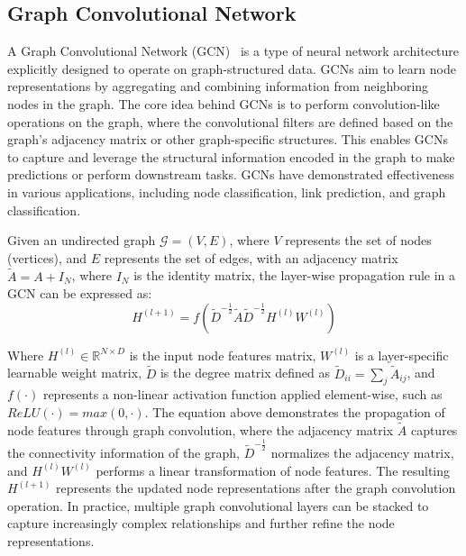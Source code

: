 \subsection{Graph Convolutional Network}
\label{subsec:graph_convolutional_network}%

A Graph Convolutional Network (GCN)~\cite{DBLP:journals/corr/KipfW16, daigavane2021understanding} is a type of neural network architecture explicitly designed to operate on graph-structured data.
GCNs aim to learn node representations by aggregating and combining information from neighboring nodes in the graph.
The core idea behind GCNs is to perform convolution-like operations on the graph, where the convolutional filters are defined based on the graph's adjacency matrix or other graph-specific structures.
This enables GCNs to capture and leverage the structural information encoded in the graph to make predictions or perform downstream tasks.
GCNs have demonstrated effectiveness in various applications, including node classification, link prediction, and graph classification.

Given an undirected graph $\mathcal{G} = (V, E)$, where $V$ represents the set of nodes (vertices), and $E$ represents the set of edges, with an adjacency matrix $\tilde{A}=A+I_N$, where $I_N$ is the identity matrix, the layer-wise propagation rule in a GCN can be expressed as:
\begin{equation}
    \label{eq:gcn_convolution}
    H^{(l+1)} = f \left( \tilde{D}^{-\tfrac{1}{2}}  \tilde{A}  \tilde{D}^{-\tfrac{1}{2}}  H^{(l)}  W^{(l)} \right)
\end{equation}

Where $H^{(l)} \in \mathbb{R}^{N \times D}$ is the input node features matrix, $W^{(l)}$ is a layer-specific learnable weight matrix, $\tilde{D}$ is the degree matrix defined as $\tilde{D}_{ii} = \sum_{j} \tilde{A}_{ij}$, and $f(\cdot)$ represents a non-linear activation function applied element-wise, such as $ReLU(\cdot) = max(0, \cdot)$.
The equation above demonstrates the propagation of node features through graph convolution, where the adjacency matrix $\tilde{A}$ captures the connectivity information of the graph, $\tilde{D}^{-\tfrac{1}{2}}$ normalizes the adjacency matrix, and $H^{(l)}  W^{(l)}$ performs a linear transformation of node features.
The resulting $H^{(l+1)}$ represents the updated node representations after the graph convolution operation.
In practice, multiple graph convolutional layers can be stacked to capture increasingly complex relationships and further refine the node representations.

